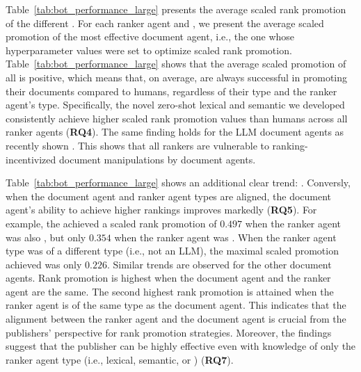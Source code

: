 


Table~\ref{tab:bot_performance_large} presents the average scaled rank promotion of the different \botagents. For each ranker agent and \botagent, we present the average scaled promotion of the most effective document agent, i.e., the one whose hyperparameter values were set to optimize scaled rank promotion. Table~\ref{tab:bot_performance_large} shows that the average scaled promotion of all \botagents is positive, which means that, on average, \botagents are always successful in promoting their documents compared to humans, regardless of their type and the ranker agent's type. Specifically, the novel zero-shot lexical and semantic \botagents we developed consistently achieve higher scaled rank promotion values than humans across all ranker agents (\textbf{RQ4}). 
The same finding holds for the LLM document agents as recently shown \cite{Niv}.
This shows that all rankers are vulnerable to ranking-incentivized document manipulations by document agents. 

Table~\ref{tab:bot_performance_large} shows an additional clear trend: . 
Conversly, when the document agent and ranker agent types are aligned, 
the document agent's ability to achieve higher rankings improves markedly (\textbf{RQ5}).
For example, the \gemma \botagent achieved a scaled rank promotion of $0.497$ when the ranker agent was also \gemma, but only $0.354$ when the ranker agent was \llama. When the ranker agent type was of a different type (i.e., not an LLM), the maximal scaled promotion achieved was only $0.226$.
Similar trends are observed for the other document agents. 
Rank promotion is highest when the document agent and the ranker agent are the same.  
The second highest rank promotion is attained when the ranker agent is of the same type as the document agent.
This indicates that the alignment between the ranker agent and the document agent is crucial from the publishers' perspective for rank promotion strategies.
Moreover, the findings suggest that the publisher can be highly effective even with knowledge of only the ranker agent type (i.e., lexical, semantic, or \llm) (\textbf{RQ7}).
